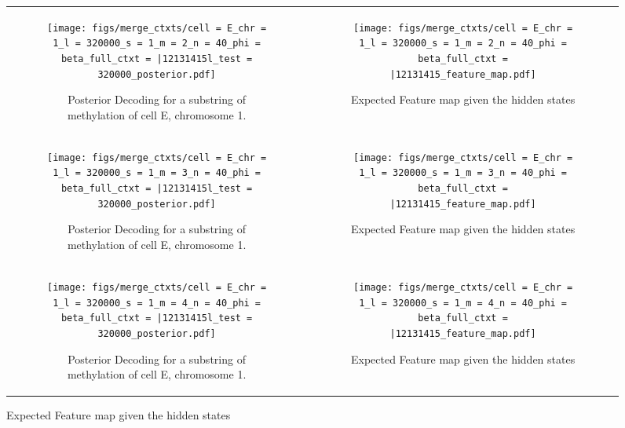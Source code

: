 \documentclass{article}
\begin{document}
\begin{figure}[H]
    \begin{tabular}{cc}
      \begin{subfigure}[t]{0.4\textwidth}
        \texttt{[image: figs/merge\_ctxts/cell = E\_chr = 1\_l = 320000\_s = 1\_m = 2\_n = 40\_phi = beta\_full\_ctxt = |12131415l\_test = 320000\_posterior.pdf]}
        \caption{Posterior Decoding for a substring of methylation of cell E, chromosome 1.}
      \end{subfigure}
      &
      \begin{subfigure}[t]{0.4\textwidth}
        \texttt{[image: figs/merge\_ctxts/cell = E\_chr = 1\_l = 320000\_s = 1\_m = 2\_n = 40\_phi = beta\_full\_ctxt = |12131415\_feature\_map.pdf]}
        \caption{Expected Feature map given the hidden states}
      \end{subfigure}
      \\
      \begin{subfigure}[t]{0.4\textwidth}
        \texttt{[image: figs/merge\_ctxts/cell = E\_chr = 1\_l = 320000\_s = 1\_m = 3\_n = 40\_phi = beta\_full\_ctxt = |12131415l\_test = 320000\_posterior.pdf]}
        \caption{Posterior Decoding for a substring of methylation of cell E, chromosome 1.}
      \end{subfigure}
      &
      \begin{subfigure}[t]{0.4\textwidth}
        \texttt{[image: figs/merge\_ctxts/cell = E\_chr = 1\_l = 320000\_s = 1\_m = 3\_n = 40\_phi = beta\_full\_ctxt = |12131415\_feature\_map.pdf]}
        \caption{Expected Feature map given the hidden states}
      \end{subfigure}
      \\
      \begin{subfigure}[t]{0.4\textwidth}
        \texttt{[image: figs/merge\_ctxts/cell = E\_chr = 1\_l = 320000\_s = 1\_m = 4\_n = 40\_phi = beta\_full\_ctxt = |12131415l\_test = 320000\_posterior.pdf]}
        \caption{Posterior Decoding for a substring of methylation of cell E, chromosome 1.}
      \end{subfigure}
      &
      \begin{subfigure}[t]{0.4\textwidth}
        \texttt{[image: figs/merge\_ctxts/cell = E\_chr = 1\_l = 320000\_s = 1\_m = 4\_n = 40\_phi = beta\_full\_ctxt = |12131415\_feature\_map.pdf]}
        \caption{Expected Feature map given the hidden states}
      \end{subfigure}
    \end{tabular}
  \end{figure}
\end{document}
